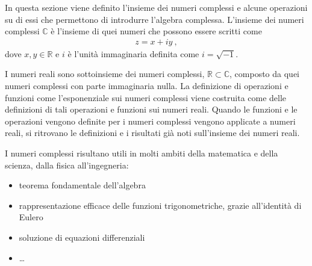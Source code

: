 \documentclass[letterpaper,10pt,italian]{jupyterBook}
\begin{document}
\sphinxAtStartPar
In questa sezione viene definito l’insieme dei numeri complessi e alcune operazioni su di essi che permettono di introdurre l’algebra complessa. L’insieme dei numeri complessi \(\mathbb{C}\) è l’insieme di quei numeri che possono essere scritti come
\begin{equation*}
\begin{split}z = x + i y \ ,\end{split}
\end{equation*}
\sphinxAtStartPar
dove \(x, y \in \mathbb{R}\) e \(i\) è l’unità immaginaria definita come \(i = \sqrt{-1}\).

\sphinxAtStartPar
I numeri reali sono sottoinsieme dei numeri complessi, \(\mathbb{R} \subset \mathbb{C}\), composto da quei numeri complessi con parte immaginaria nulla. La definizione di operazioni e funzioni \sphinxhyphen{} come l’esponenziale \sphinxhyphen{} sui numeri complessi viene costruita come  delle definizioni di tali operazioni e funzioni sui numeri reali. Quando le funzioni e le operazioni vengono definite per i numeri complessi vengono applicate a numeri reali, si ritrovano le definizioni e i risultati già noti sull’insieme dei numeri reali.

\sphinxAtStartPar
I numeri complessi risultano utili in molti ambiti della matematica e della scienza, dalla fisica all’ingegneria:
\begin{itemize}
\item {} 
\sphinxAtStartPar
teorema fondamentale dell’algebra

\item {} 
\sphinxAtStartPar
rappresentazione efficace delle funzioni trigonometriche, grazie all’identità di Eulero

\item {} 
\sphinxAtStartPar
soluzione di equazioni differenziali

\item {} 
\sphinxAtStartPar
…

\end{itemize}
\end{document}
